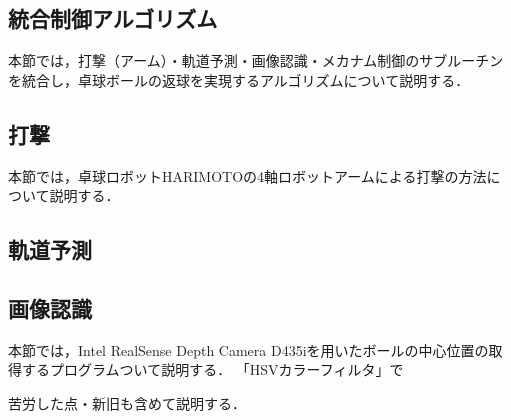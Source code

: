 \documentclass[11pt, oneside, titlepage]{jarticle}
\begin{document}
\subsection{統合制御アルゴリズム}
本節では，打撃（アーム）・軌道予測・画像認識・メカナム制御のサブルーチンを統合し，卓球ボールの返球を実現するアルゴリズムについて説明する．
\subsection{打撃}
本節では，卓球ロボットHARIMOTOの4軸ロボットアームによる打撃の方法について説明する．
\subsection{軌道予測}
\subsection{画像認識}
本節では，Intel RealSense Depth Camera D435iを用いたボールの中心位置の取得するプログラムついて説明する．
「HSVカラーフィルタ」で

苦労した点・新旧も含めて説明する．\cite{detect2}
\end{document}

